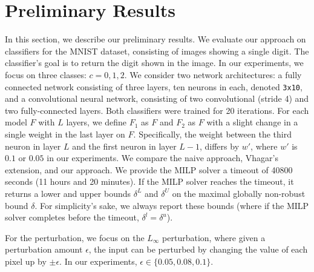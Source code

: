 
\section{Preliminary Results}
In this section, we describe our preliminary results.
We evaluate our approach on classifiers for the MNIST dataset, consisting of images showing a single digit.
The classifier's goal is to return the digit shown in the image. In our experiments, we focus on three classes: $c=0,1,2$.
We consider two network architectures: 
a fully connected network consisting of three layers, ten neurons in each, denoted \texttt{3x10}, and a convolutional neural network, 
consisting of two convolutional (stride 4) and two fully-connected layers. Both classifiers were trained for 20 iterations.
For each model $F$ with $L$ layers, we define $F_1$ as $F$ and $F_2$ as $F$ with a slight change in a single weight in the last layer on $F$. Specifically, the weight between the third neuron in layer $L$ and the first neuron in layer $L-1$, differs by $w'$, where $w'$ is $0.1$ or $0.05$ in our experiments.
We compare the naive approach, Vhagar's extension, and our approach.
We provide the MILP solver a timeout of 40800 seconds (11 hours and 20 minutes).
If the MILP solver reaches the timeout, it returns a lower and upper bounds $\delta^L$ and $\delta^U$ on the maximal globally non-robust bound $\delta$. For simplicity's sake, we always report these bounds (where if the MILP solver completes before the timeout, $\delta^l=\delta^u$).
\begin{comment}
\begin{table}[H]
    \centering
    \resizebox{\textwidth}{!}{
    \begin{tabular}{@{\extracolsep{\fill}}llll@{}}
        \toprule
        \makecell{Dataset} & \makecell{Name} & \makecell{Architecture}  & \makecell{Iterations during training} \\
        \midrule            
        \multirow{2}{*}{MNIST} & 3 x 10 & 3 fully-connected layers & 20 \\
                               & CNN & 2 convolutional (stride 4) and 2 fully-connected layers & 20 \\
        \bottomrule
    \end{tabular}
    }
    \caption{The networks used for this experience.
        \label{table_architectures}}
\end{table}
\end{comment}
For the perturbation, we focus on the $L_\infty$ perturbation, where given a perturbation amount $\epsilon$, the input can be perturbed by changing the value of each pixel up by $\pm\epsilon$. In our experiments, $\epsilon\in\{0.05,0.08,0.1\}$.


